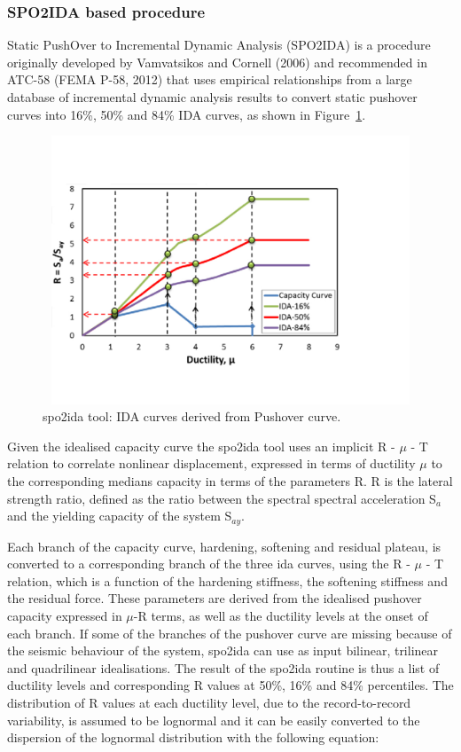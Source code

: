 \subsubsection{SPO2IDA based procedure}
\label{subsubsec:spo2ida}
Static PushOver to Incremental Dynamic Analysis (SPO2IDA) is a procedure originally developed by Vamvatsikos and Cornell (2006) and recommended in ATC-58 (FEMA P-58, 2012) that uses empirical relationships from a large database of incremental dynamic analysis results to convert static pushover curves into 16\%, 50\% and 84\% IDA curves, as shown in Figure~\ref{fig:spo2ida}.

\begin{figure}[H]
\centering
\includegraphics[width=12cm,height=8cm]{./figures/spo2ida.jpg}
\caption{spo2ida tool: IDA curves derived from Pushover curve.}
\label{fig:spo2ida}
\end{figure}

Given the idealised capacity curve the spo2ida tool uses an implicit R - $\mu$ - T relation to correlate nonlinear displacement, expressed in terms of ductility $\mu$ to the corresponding medians capacity in terms of the parameters R. R is the lateral strength ratio, defined as the ratio between the spectral spectral acceleration S$_a$ and the yielding capacity of the system S$_{ay}$. 

Each branch of the capacity curve, hardening, softening and residual plateau, is converted to a corresponding branch of the three ida curves, using the R - $\mu$ - T relation, which is a function of the hardening stiffness, the softening stiffness and the residual force. These parameters are derived from the idealised pushover capacity expressed in $\mu$-R terms, as well as the ductility levels at the onset of each branch. If some of the branches of the pushover curve are missing because of the seismic behaviour of the system, spo2ida can use as input bilinear, trilinear and quadrilinear idealisations.
The result of the spo2ida routine is thus a list of ductility levels and corresponding R values at 50\%, 16\% and 84\% percentiles. The distribution of R values at each ductility level, due to the record-to-record variability, is assumed to be lognormal and it can be easily converted to the dispersion of the lognormal distribution with the following equation:

